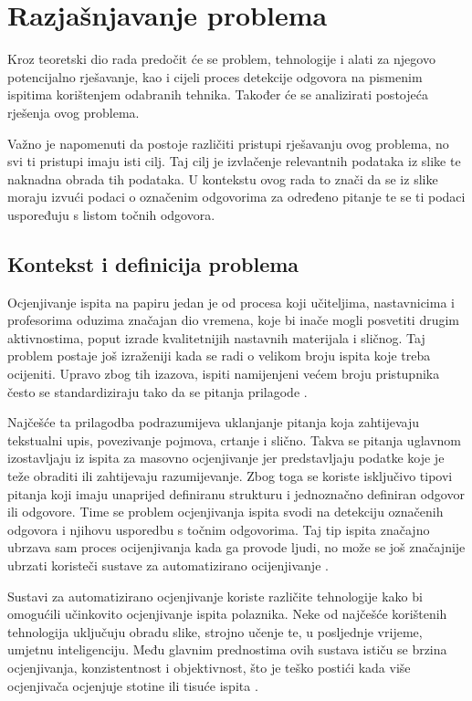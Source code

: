 \documentclass{foi}
\begin{document}
\chapter{Razjašnjavanje problema}

Kroz teoretski dio rada predočit će se problem, tehnologije i alati za njegovo potencijalno rješavanje, kao i cijeli proces detekcije odgovora na pismenim ispitima korištenjem odabranih tehnika. Također će se analizirati postojeća rješenja ovog problema.

Važno je napomenuti da postoje različiti pristupi rješavanju ovog problema, no svi ti pristupi imaju isti cilj. Taj cilj je izvlačenje relevantnih podataka iz slike te naknadna obrada tih podataka. U kontekstu ovog rada to znači da se iz slike moraju izvući podaci o označenim odgovorima za određeno pitanje te se ti podaci uspoređuju s listom točnih odgovora.

\section{Kontekst i definicija problema}

Ocjenjivanje ispita na papiru jedan je od procesa koji učiteljima, nastavnicima i profesorima oduzima značajan dio vremena, koje bi inače mogli posvetiti drugim aktivnostima, poput izrade kvalitetnijih nastavnih materijala i sličnog. Taj problem postaje još izraženiji kada se radi o velikom broju ispita koje treba ocijeniti. Upravo zbog tih izazova, ispiti namijenjeni većem broju pristupnika često se standardiziraju tako da se pitanja prilagode \cite{Bloomfield}.

Najčešće ta prilagodba podrazumijeva uklanjanje pitanja koja zahtijevaju tekstualni upis, povezivanje pojmova, crtanje i slično. Takva se pitanja uglavnom izostavljaju iz ispita za masovno ocjenjivanje jer predstavljaju podatke koje je teže obraditi ili zahtijevaju  razumijevanje. Zbog toga se koriste isključivo tipovi pitanja koji imaju unaprijed definiranu strukturu i jednoznačno definiran odgovor ili odgovore. Time se problem ocjenjivanja ispita svodi na detekciju označenih odgovora i njihovu usporedbu s točnim odgovorima. Taj tip ispita značajno ubrzava sam proces ocijenjivanja kada ga provode ljudi, no može se još značajnije ubrzati koristeči sustave za automatizirano ocijenjivanje \cite{sabbott2015Nov}.

Sustavi za automatizirano ocjenjivanje koriste različite tehnologije kako bi omogućili učinkovito ocjenjivanje ispita polaznika. Neke od najčešće korištenih tehnologija uključuju obradu slike, strojno učenje te, u posljednje vrijeme, umjetnu inteligenciju. Među glavnim prednostima ovih sustava ističu se brzina ocjenjivanja, konzistentnost i objektivnost, što je teško postići kada više ocjenjivača ocjenjuje stotine ili tisuće ispita \cite{Leonard2025Feb}.
\end{document}
